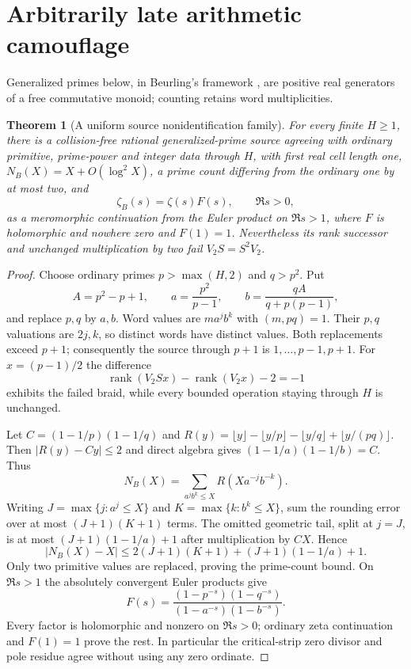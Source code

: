 \documentclass[11pt]{article}
\newtheorem{theorem}{Theorem}
\begin{document}
\section{Arbitrarily late arithmetic camouflage}
Generalized primes below, in Beurling's framework \cite{beurling}, are positive real generators of a free commutative
monoid; counting retains word multiplicities.
\begin{theorem}[A uniform source nonidentification family]
For every finite $H\ge1$, there is a collision-free rational generalized-prime
source agreeing with ordinary primitive, prime-power and integer data through
$H$, with first real cell length one, $N_B(X)=X+O(\log^2X)$, a prime count
differing from the ordinary one by at most two, and
\[
\zeta_B(s)=\zeta(s)F(s),\qquad \Re s>0,
\]
as a meromorphic continuation from the Euler product on $\Re s>1$,
where $F$ is holomorphic and nowhere zero and $F(1)=1$. Nevertheless its rank
successor and unchanged multiplication by two fail $V_2S=S^2V_2$.
\end{theorem}
\begin{proof}
Choose ordinary primes $p>\max(H,2)$ and $q>p^2$. Put
\[
A=p^2-p+1,\qquad a=\frac{p^2}{p-1},\qquad
b=\frac{qA}{q+p(p-1)},
\]
and replace $p,q$ by $a,b$. Word values are $ma^jb^k$ with $(m,pq)=1$.
Their $p,q$ valuations are $2j,k$, so distinct words have distinct values.
Both replacements exceed $p+1$; consequently the source through $p+1$ is
$1,\ldots,p-1,p+1$. For $x=(p-1)/2$ the difference
\[
\operatorname{rank}(V_2Sx)-\operatorname{rank}(V_2x)-2=-1
\]
exhibits the failed braid, while every bounded operation staying through $H$
is unchanged.

Let $C=(1-1/p)(1-1/q)$ and
$R(y)=\lfloor y\rfloor-\lfloor y/p\rfloor-\lfloor y/q\rfloor+\lfloor y/(pq)\rfloor$.
Then $|R(y)-Cy|\le2$ and direct algebra gives
$(1-1/a)(1-1/b)=C$. Thus
\[
N_B(X)=\sum_{a^jb^k\le X}R(Xa^{-j}b^{-k}).
\]
Writing $J=\max\{j:a^j\le X\}$ and $K=\max\{k:b^k\le X\}$, sum the
rounding error over at most $(J+1)(K+1)$ terms. The omitted geometric tail,
split at $j=J$, is at most $(J+1)(1-1/a)+1$ after multiplication by $CX$.
Hence
\[
|N_B(X)-X|\le2(J+1)(K+1)+(J+1)(1-1/a)+1.
\]
Only two primitive values are replaced, proving the prime-count bound.
On $\Re s>1$ the absolutely convergent Euler products give
\[
F(s)=\frac{(1-p^{-s})(1-q^{-s})}{(1-a^{-s})(1-b^{-s})}.
\]
Every factor is holomorphic and nonzero on $\Re s>0$; ordinary zeta
continuation and $F(1)=1$ prove the rest. In particular the critical-strip
zero divisor and pole residue agree without using any zero ordinate.
\end{proof}
\end{document}
